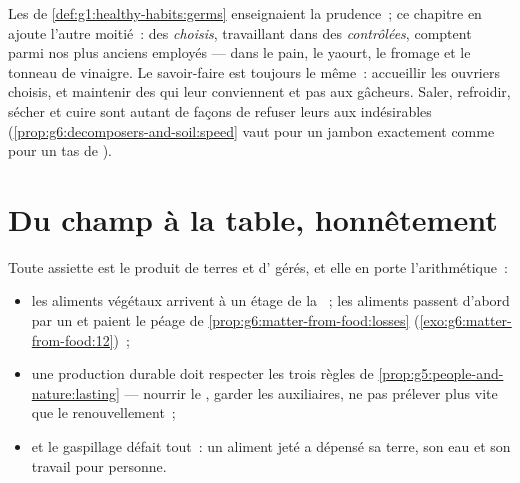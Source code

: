 \begin{remark}\label{rem:g6:producing-our-food:goodbad}
Les  de \cref{def:g1:healthy-habits:germs} enseignaient la
prudence~; ce chapitre en ajoute l'autre moitié~: des 
\emph{choisis}, travaillant dans des 
\emph{contrôlées}, comptent parmi nos plus anciens employés --- dans
le pain, le yaourt, le fromage et le tonneau de vinaigre. Le
savoir-faire est toujours le même~: accueillir les ouvriers choisis,
et maintenir des  qui leur conviennent et pas aux
gâcheurs. Saler, refroidir, sécher et cuire sont autant de façons de
refuser leurs  aux  indésirables
(\cref{prop:g6:decomposers-and-soil:speed} vaut pour un jambon
exactement comme pour un tas de ).
\end{remark}

\section{Du champ à la table, honnêtement}

\begin{proposition}\label{prop:g6:producing-our-food:costs}
Toute assiette est le produit de terres et d' gérés, et
elle en porte l'arithmétique~:
\begin{itemize}
  \item les aliments végétaux arrivent à un étage de la ~;
        les aliments  passent d'abord par un  et
        paient le péage de
        \cref{prop:g6:matter-from-food:losses}
        (\cref{exo:g6:matter-from-food:12})~;
  \item une production durable doit respecter les trois règles de
        \cref{prop:g5:people-and-nature:lasting} --- nourrir le
        , garder les auxiliaires, ne pas prélever plus vite que
        le renouvellement~;
  \item et le gaspillage défait tout~: un aliment jeté a dépensé sa
        terre, son eau et son travail pour personne.
\end{itemize}
\end{proposition}
\admitted


